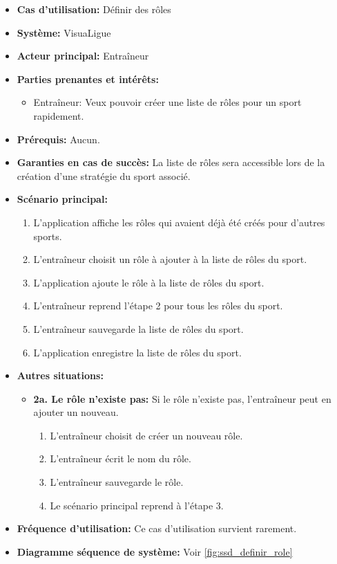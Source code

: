 \begin{itemize}
    \item \textbf{Cas d'utilisation:} D\'efinir des r\^oles
    \item \textbf{Syst\`eme:} VisuaLigue
    \item \textbf{Acteur principal:} Entra\^ineur
    \item \textbf{Parties prenantes et int\'er\^ets:}
        \begin{itemize}
            \item Entraîneur: Veux pouvoir créer une liste de rôles pour un sport rapidement.
        \end{itemize}
    \item \textbf{Pr\'erequis:} Aucun.
    \item \textbf{Garanties en cas de succ\`es:} La liste de rôles sera accessible lors de la création d'une stratégie du sport associé.
    \item \textbf{Sc\'enario principal:}
        \begin{enumerate}
            \item L'application affiche les rôles qui avaient déjà été créés pour d'autres sports.
            \item L'entraîneur choisit un rôle à ajouter à la liste de rôles du sport.
            \item L'application ajoute le rôle à la liste de rôles du sport.
            \item L'entraîneur reprend l'étape 2 pour tous les rôles du sport.
            \item L'entraîneur sauvegarde la liste de rôles du sport.
            \item L'application enregistre la liste de rôles du sport.
        \end{enumerate}
    \item \textbf{Autres situations:}
        \begin{itemize}
            \item \textbf{2a. Le rôle n'existe pas:} Si le rôle n'existe pas, l'entraîneur peut en ajouter un nouveau.
                \begin{enumerate}
                    \item L'entraîneur choisit de créer un nouveau rôle.
                    \item L'entraîneur écrit le nom du rôle.
                    \item L'entraîneur sauvegarde le rôle.
                    \item Le scénario principal reprend à l'étape 3.
                \end{enumerate}
        \end{itemize}
    \item \textbf{Fréquence d'utilisation:} Ce cas d'utilisation survient rarement.
    \item \textbf{Diagramme s\'equence de syst\`eme:} Voir \ref{fig:ssd_definir_role}
\end{itemize}

